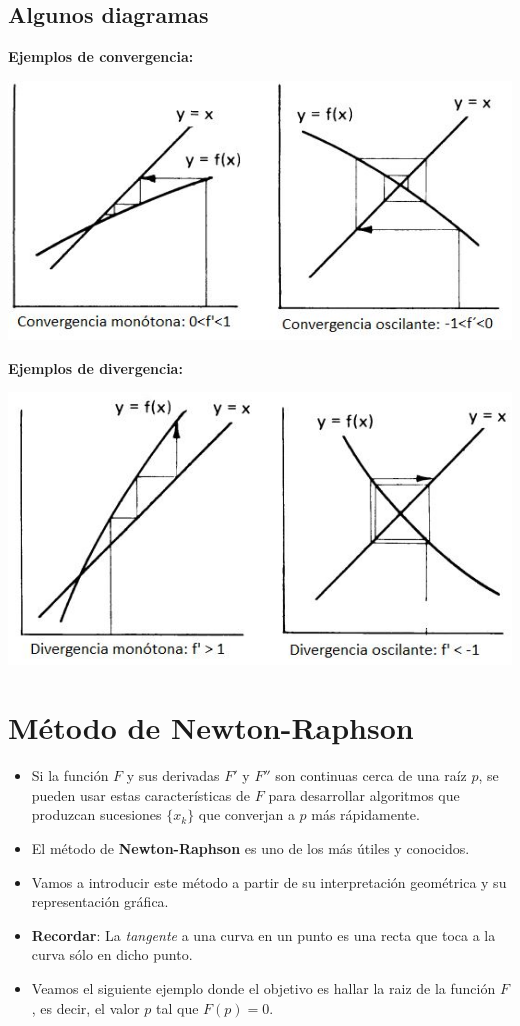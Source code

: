 \documentclass[openany]{book}
\providecommand{\tightlist}{%
  \setlength{\itemsep}{0pt}\setlength{\parskip}{0pt}}
\begin{document}
\hypertarget{algunos-diagramas}{%
\subsection{Algunos diagramas}\label{algunos-diagramas}}

\textbf{Ejemplos de convergencia:}

\begin{center}\includegraphics[width=0.75\linewidth]{Plots/U2/convergencia} \end{center}

\textbf{Ejemplos de divergencia:}

\begin{center}\includegraphics[width=0.75\linewidth]{Plots/U2/divergencia} \end{center}

\hypertarget{muxe9todo-de-newton-raphson}{%
\section{Método de Newton-Raphson}\label{muxe9todo-de-newton-raphson}}

\begin{itemize}
\tightlist
\item
  Si la función \(F\) y sus derivadas \(F'\) y \(F''\) son continuas cerca de una raíz \(p\), se pueden usar estas características de \(F\) para desarrollar algoritmos que produzcan sucesiones \(\{x_k\}\) que converjan a \(p\) más rápidamente.
\item
  El método de \textbf{Newton-Raphson} es uno de los más útiles y conocidos.
\item
  Vamos a introducir este método a partir de su interpretación geométrica y su representación gráfica.
\item
  \textbf{Recordar}: La \emph{tangente} a una curva en un punto es una recta que toca a la curva sólo en dicho punto.
\item
  Veamos el siguiente ejemplo donde el objetivo es hallar la raiz de la función \(F\), es decir, el valor \(p\) tal que \(F(p) = 0\).
\end{itemize}
\end{document}

